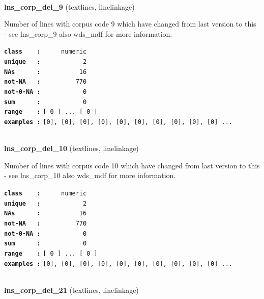 \documentclass[]{article}
\begin{document}
~

\textbf{lns\_corp\_del\_9} (textlines, linelinkage)

Number of lines with corpus code 9 which have changed from last version
to this - see lns\_corp\_9 also wds\_mdf for more information.

\textbf{\texttt{class\ \ \ \ :}} \texttt{~~~~~numeric}\\
\textbf{\texttt{unique\ \ \ :}} \texttt{~~~~~~~~~~~2}\\
\textbf{\texttt{NAs\ \ \ \ \ \ :}} \texttt{~~~~~~~~~~16}\\
\textbf{\texttt{not-NA\ \ \ :}} \texttt{~~~~~~~~~770}\\
\textbf{\texttt{not-0-NA\ :}} \texttt{~~~~~~~~~~~0}\\
\textbf{\texttt{sum\ \ \ \ \ \ :}} \texttt{~~~~~~~~~~~0}\\
\textbf{\texttt{range\ \ \ \ :}}
\texttt{{[}\ 0\ {]}\ ...\ {[}\ 0\ {]}}\\
\textbf{\texttt{examples\ :}}
\texttt{{[}0{]},\ {[}0{]},\ {[}0{]},\ {[}0{]},\ {[}0{]},\ {[}0{]},\ {[}0{]},\ {[}0{]},\ {[}0{]},\ {[}0{]}\ ...}\\

~

\textbf{lns\_corp\_del\_10} (textlines, linelinkage)

Number of lines with corpus code 10 which have changed from last version
to this - see lns\_corp\_10 also wds\_mdf for more information.

\textbf{\texttt{class\ \ \ \ :}} \texttt{~~~~~numeric}\\
\textbf{\texttt{unique\ \ \ :}} \texttt{~~~~~~~~~~~2}\\
\textbf{\texttt{NAs\ \ \ \ \ \ :}} \texttt{~~~~~~~~~~16}\\
\textbf{\texttt{not-NA\ \ \ :}} \texttt{~~~~~~~~~770}\\
\textbf{\texttt{not-0-NA\ :}} \texttt{~~~~~~~~~~~0}\\
\textbf{\texttt{sum\ \ \ \ \ \ :}} \texttt{~~~~~~~~~~~0}\\
\textbf{\texttt{range\ \ \ \ :}}
\texttt{{[}\ 0\ {]}\ ...\ {[}\ 0\ {]}}\\
\textbf{\texttt{examples\ :}}
\texttt{{[}0{]},\ {[}0{]},\ {[}0{]},\ {[}0{]},\ {[}0{]},\ {[}0{]},\ {[}0{]},\ {[}0{]},\ {[}0{]},\ {[}0{]}\ ...}\\

~

\textbf{lns\_corp\_del\_21} (textlines, linelinkage)
\end{document}
